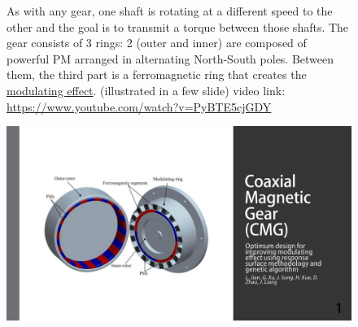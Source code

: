 \begin{figure}[H]
    \begin{minipage}{.45\linewidth}
        As with any gear, one shaft is rotating at a different speed to the other and the goal is to transmit a torque between those shafts. 
        The gear consists of 3 rings:
        2 (outer and inner) are composed of powerful PM arranged in alternating North-South poles. Between them, the third part is a ferromagnetic ring that creates the \underline{ modulating effect}. (illustrated in a few slide)
        video link: \url{https://www.youtube.com/watch?v=PyBTE5cjGDY}
    \end{minipage}
    \hfill%
    \begin{minipage}[c]{.45\linewidth}
        \centering
        \includegraphics[page={9},width=\textwidth]{LELEC2311.allow.pdf}
    \end{minipage}
\end{figure}

